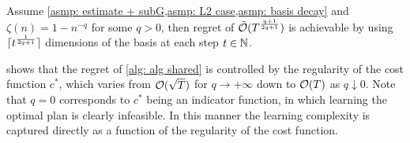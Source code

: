 \begin{corollary}\label{cor: restating bounds for intrinsic regularity}
    Assume \cref{asmp: estimate + subG,asmp: L2 case,asmp: basis decay} and $\zeta(n)=1-n^{-q}$ for some $q>0$, then regret of $\tilde{\mathcal{O}}(T^{\frac{q+1}{2q+1}})$ is achievable by using $\lceil t^{\frac{1}{2q+1}}\rceil$ dimensions of the basis at each step $t\in\mathbb{N}$.
\end{corollary}


 
 shows that the regret of \cref{alg: alg shared} is controlled by the regularity of the cost function $c^*$, which varies from $\mathcal{O}(\sqrt{T})$ for $q\to +\infty$ down to $\mathcal{O}(T)$ as $q\downarrow0$. Note that $q=0$ corresponds to $c^*$ being an indicator function, in which learning the optimal plan is clearly infeasible. In this manner the learning complexity is captured directly as a function of the regularity of the cost function. 



